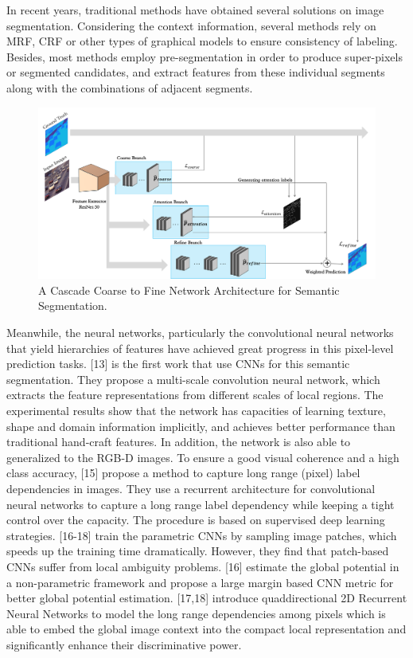 \documentclass[10.5pt,compsoc]{TsT}
\newcommand{\upcite}[1]{\superscript{\textsuperscript{\cite{#1}}}}
\theoremstyle{mystyle}
\newcommand{\upcite}[1]{\textsuperscript{\cite{#1}}}
\begin{document}
{In recent years, traditional methods have obtained several solutions on image segmentation. Considering the context information, several methods rely on MRF, CRF or other types of graphical models to ensure consistency of labeling\upcite{10,11,12}. Besides, most methods employ pre-segmentation in order to produce super-pixels or segmented candidates, and extract features from these individual segments along with the combinations of adjacent segments.
\begin{figure}[!ht]
\centering
\includegraphics[width=1.9\columnwidth]{fig2.png}
\caption{A Cascade Coarse to Fine Network Architecture for Semantic Segmentation.}
\label{fig2}
\end{figure} 

Meanwhile, the neural networks, particularly the convolutional neural networks that yield hierarchies of features have achieved great progress in  this pixel-level prediction tasks. [13] is the first work that use CNNs for this semantic segmentation. They propose a multi-scale convolution neural network, which extracts the feature representations from different scales of local regions. The experimental results show that the network has capacities of learning texture, shape and domain information implicitly, and achieves better performance than traditional hand-craft features. In addition, the network is also able to generalized to the RGB-D images\upcite{14}. To ensure a good visual coherence and a high class accuracy, [15] propose a method to capture long range (pixel) label dependencies in images. They use a recurrent architecture for convolutional neural networks to capture a long range label dependency while keeping a tight control over the capacity. The procedure is based on supervised deep learning strategies. [16-18] train the parametric CNNs by sampling image patches, which speeds up the training time dramatically. However, they find that patch-based CNNs suffer from local ambiguity problems. [16] estimate the global potential in a non-parametric framework and propose a large margin based CNN metric for better global potential estimation. [17,18] introduce quaddirectional 2D Recurrent Neural Networks to model the long range dependencies among pixels which is able to embed the global image context into the compact local representation and significantly enhance their discriminative power.


}
\end{document}
